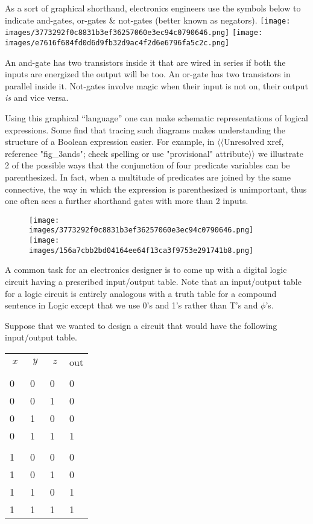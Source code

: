 \documentclass[10pt,]{book}
\theoremstyle{plain}
\theoremstyle{definition}
\theoremstyle{definition}
\numberwithin{equation}{section}
\newcommand{\hrulethin}  {\noalign{\hrule height 0.04em}}
\begin{document}
    As a sort of graphical shorthand, electronics engineers use the symbols
    below to indicate and-gates, or-gates \& not-gates (better known as negators).
\texttt{[image: images/3773292f0c8831b3ef36257060e3ec94c0790646.png]}
\texttt{[image: images/e7616f684fd0d6d9fb32d9ac4f2d6e6796fa5c2c.png]}
\par

    An and-gate has two transistors inside it that are wired in series \textemdash{} if both the inputs are energized the output will be too. An
    or-gate has two transistors in parallel inside it. Not-gates
    involve magic \textemdash{} when their input is not on, their output \emph{is}
    and vice versa.
\par

    Using this graphical ``language'' one can make schematic
    representations of logical expressions. Some find that
    tracing such diagrams makes understanding the structure
    of a Boolean expression easier. For example, in {$\langle\langle$Unresolved xref, reference "fig\_3ands"; check spelling or use "provisional" attribute$\rangle\rangle$}
    we illustrate 2 of the possible ways that the conjunction
    of four predicate variables can be parenthesized. In fact, when
    a multitude of predicates are joined by the same connective,
    the way in which the expression is parenthesized is unimportant,
    thus one often sees a further shorthand \textemdash{} gates with more than
    2 inputs.
\leavevmode%
\begin{figure}
\centering
\texttt{[image: images/3773292f0c8831b3ef36257060e3ec94c0790646.png]}
\texttt{[image: images/156a7cbb2bd04164ee64f13ca3f9753e291741b8.png]}
\textemdash{}\end{figure}
\par

    A common task for an electronics designer is to come up with
    a digital logic circuit having a prescribed input/output table.
    Note that an input/output table for a logic circuit is entirely
    analogous with a truth table for a compound sentence in Logic \textemdash{}
    except that we use 0's and 1's rather than T's and \(\phi\)'s.
\par

    Suppose that we wanted to design a circuit that would
    have the following input/output table.
\begin{tabular}{llll}
\(\; x \;\)&\(\; y \;\)&\(\; z \;\)&out\tabularnewline[0pt]
&&&\tabularnewline\hrulethin
0&0&0&0\tabularnewline[0pt]
0&0&1&0\tabularnewline[0pt]
0&1&0&0\tabularnewline[0pt]
0&1&1&1\tabularnewline[0pt]
&&&\tabularnewline\hrulethin
1&0&0&0\tabularnewline[0pt]
1&0&1&0\tabularnewline[0pt]
1&1&0&1\tabularnewline[0pt]
1&1&1&1
\end{tabular}
\par
\end{document}

